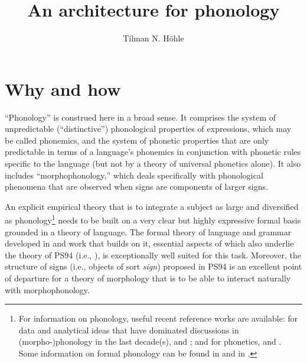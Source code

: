 \documentclass[output=paper]{langsci/langscibook}
\author{Tilman N. Höhle}
\title{An architecture for phonology}
\begin{document}
\label{chap-phonology}


\renewcommand*{\thefootnote}{\fnsymbol{footnote}}
\setcounter{footnote}{4}



\renewcommand*{\thefootnote}{\arabic{footnote}}
\setcounter{footnote}{0}

\section{Why and how}


``Phonology'' is construed here in a broad sense. It comprises the system
of unpredictable (``distinctive'') phonological properties of expressions,
which may be called phonemics, and the system of phonetic properties that
are only predictable in terms of a language's phonemics in conjunction with
phonetic rules specific to the language (but not by a theory of universal
phonetics alone). It also includes ``morphophonology,'' which deals
specifically with phonological phenomena that are observed when signs are
components of larger signs.

An explicit empirical theory that 
is
 to integrate a subject as large
and diversified as phonology\footnote{%
	For information on phonology, useful
  recent reference works are available: for data and analytical ideas that
  have dominated discussions in (morpho-)phonology in the last decade(s),
  \cite{kens:94} and
  \cite{goldsmith:95:ed}; and for phonetics,
  \cite{lad:mad:96} and
  \cite{har:lav:97}. Some
  information on formal phonology can be found in \cite{bird:95} and in \cite{cars:98a}.%
}
needs to
be built on a very clear but highly expressive formal basis grounded in a
theory of language.  The formal theory of language and grammar developed
in \cite{king:89} and work that builds on it,
essential aspects of which also underlie the  theory of {\small PS94}
(i.e., \citealt{PS94a}), is exceptionally
well suited for this task.  Moreover, the structure of signs (i.e., objects
of sort \textit{sign}) proposed in {\small PS94} is an excellent point of
departure for a theory of morphology that is to be able to interact
naturally with morphophonology.
\end{document}
